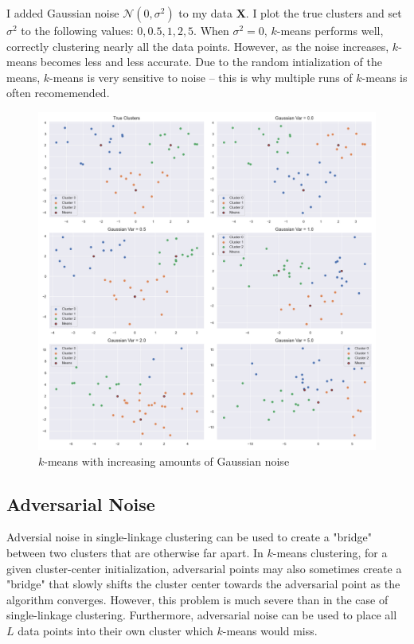 \documentclass{article}
\begin{document}
        I added Gaussian noise $\mathcal{N}(0, \sigma^2)$ to my data $\mathbf{X}$. I plot the true clusters and set $\sigma^2$ to the following values: $0, 0.5, 1, 2, 5$. When $\sigma^2=0$, $k$-means performs well, correctly clustering nearly all the data points. However, as the noise increases, $k$-means becomes less and less accurate. Due to the random intialization of the means, $k$-means is very sensitive to noise -- this is why multiple runs of $k$-means is often recomemended.
        
        \begin{figure}[ht]
            \label{fig:kmeans_gaussian_noise}
                \includegraphics[width=0.99\linewidth]{images/q2/gaussian_noise.png}
                \caption{$k$-means with increasing amounts of Gaussian noise}
            \end{figure}
            \pagebreak

    \subsection[short]{Adversarial Noise}

        Adversial noise in single-linkage clustering can be used to create a "bridge" between two clusters that are otherwise far apart. In $k$-means clustering, for a given cluster-center initialization, adversarial points may also sometimes create a "bridge" that slowly shifts the cluster center towards the adversarial point as the algorithm converges. However, this problem is much severe than in the case of single-linkage clustering. Furthermore, adversarial noise can be used to place all $L$ data points into their own cluster which $k$-means would miss.
\end{document}
